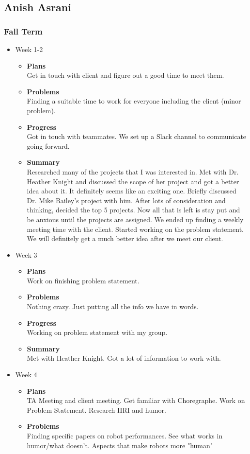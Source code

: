 
\subsection{Anish Asrani}
	\subsubsection{Fall Term}
	\begin{itemize}
		\item{Week 1-2}
			\begin{itemize}
				\item \textbf{Plans} \\
				Get in touch with client and figure out a good time to meet them.
				\item \textbf{Problems} \\
				Finding a suitable time to work for everyone including the client (minor problem).
				\item \textbf{Progress} \\
				Got in touch with teammates. We set up a Slack channel to communicate going forward. 
				\item \textbf{Summary} \\
				Researched many of the projects that I was interested in. Met with Dr. Heather Knight and discussed the scope of her project and got a better idea about it. It definitely seems like an exciting one. Briefly discussed Dr. Mike Bailey's project with him. After lots of consideration and thinking, decided the top 5 projects. Now all that is left is stay put and be anxious until the projects are assigned. 
				We ended up finding a weekly meeting time with the client. Started working on the problem statement.  We will definitely get a much better idea after we meet our client. 
			\end{itemize}
		\item{Week 3}	
			\begin{itemize}
				\item \textbf{Plans} \\
				Work on finishing problem statement.
				\item \textbf{Problems} \\
				Nothing crazy. Just putting all the info we have in words.
				\item \textbf{Progress} \\
				Working on problem statement with my group.
				\item \textbf{Summary} \\
				Met with Heather Knight. Got a lot of information to work with.
			\end{itemize}
		\item{Week 4}
			\begin{itemize}
				\item \textbf{Plans} \\
				TA Meeting and client meeting. Get familiar with Choregraphe. Work on Problem Statement. Research HRI and humor.
				\item \textbf{Problems} \\
				Finding specific papers on robot performances. See what works in humor/what doesn’t. Aspects that make robots more "human"


\end{itemize}
\end{itemize}
